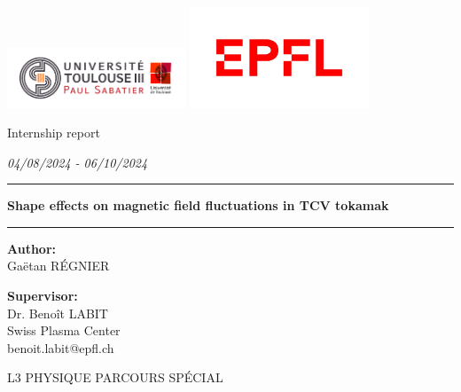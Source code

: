 \documentclass[12pt]{article}
\begin{document}
\begin{titlepage}
    \centering
    
    \includegraphics[width=0.4\textwidth, valign=c]{Logos/Logo_UT3.png} \hfill
    \includegraphics[width=0.4\textwidth, valign=c]{Logos/EPFL.png}\par
    \vspace{2cm}

     \LARGE Internship report \par

    \vspace{2cm}

    {\Large \textit{04/08/2024 - 06/10/2024}}
    \vspace{1cm}
    
    \hrule
    \vspace{0.5cm}
    \Huge \textbf{Shape effects on magnetic field fluctuations in TCV tokamak}
    \vspace{0.5cm}
    \hrule
    \vspace{3cm}

    \begin{minipage}[t]{0.45\textwidth}
        \raggedright
        \large
        \textbf{Author:}\\
        Gaëtan RÉGNIER\\
    \end{minipage}
    \hfill
    \begin{minipage}[t]{0.45\textwidth}
        \raggedleft
        \large
        \textbf{Supervisor:}\\
        Dr. Benoît LABIT\\
        Swiss Plasma Center\\
        benoit.labit@epfl.ch\\
    \end{minipage}\par
    
    
    \vfill
    
    {\large L3 PHYSIQUE PARCOURS SPÉCIAL}\par
\end{titlepage}
\thispagestyle{empty}
\begin{abstract}
    
\end{abstract}
\end{document}
